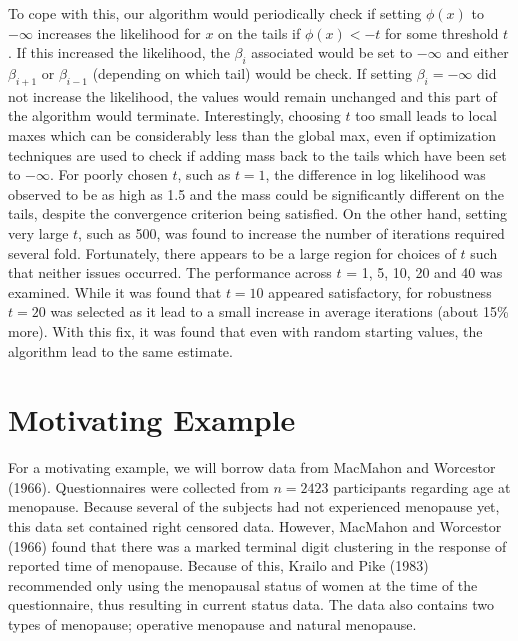 \documentclass[12pt]{article}
\numberwithin{equation}{section}
\begin{document}
	To cope with this, our algorithm would periodically check if setting $\phi(x)$ to $-\infty$ increases the likelihood for $x$ on the tails if $\phi(x) < -t$ for some threshold $t$. If this increased the likelihood, the $\beta_i$ associated would be set to $-\infty$ and either $\beta_{i+1}$ or $\beta_{i-1}$ (depending on which tail) would be check. If setting $\beta_i = -\infty$ did not increase the likelihood, the values would remain unchanged and this part of the algorithm would terminate. Interestingly, choosing $t$ too small leads to local maxes which can be considerably less than the global max, even if optimization techniques are used to check if adding mass back to the tails which have been set to $-\infty$. For poorly chosen $t$, such as $t = 1$, the difference in log likelihood was observed to be as high as 1.5 and the mass could be significantly different on the tails, despite the convergence criterion being satisfied. On the other hand, setting very large $t$, such as 500, was found to increase the number of iterations required several fold. Fortunately, there appears to be a large region for choices of $t$ such that neither issues occurred. The performance across $t$ = 1, 5, 10, 20 and 40 was examined. While it was found that $t = 10$ appeared satisfactory, for robustness $t = 20$ was selected as it lead to a small increase in average iterations (about 15\% more). With this fix, it was found that even with random starting values, the algorithm lead to the same estimate. 
		
	{\section{Motivating Example} }
	
	For a motivating example, we will borrow data from MacMahon and Worcestor (1966). Questionnaires were collected from $n = 2423$ participants regarding age at menopause. Because several of the subjects had not experienced menopause yet, this data set contained right censored data. However, MacMahon and Worcestor (1966) found that there was a marked terminal digit clustering in the response of reported time of menopause. Because of this, Krailo and Pike (1983) recommended only using the menopausal status of women at the time of the questionnaire, thus resulting in current status data. The data also contains two types of menopause; operative menopause and natural menopause. 
	
\end{document}
